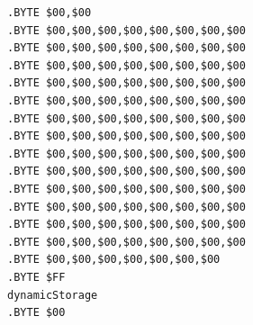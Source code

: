 \begin{minipage}[b]{1\linewidth}
\begin{minipage}[b]{0.33\linewidth}
\begin{lrbox}{\mybox}
\begin{lstlisting}[basicstyle=\ttfamily\tiny]
.BYTE $00,$00
.BYTE $00,$00,$00,$00,$00,$00,$00,$00
.BYTE $00,$00,$00,$00,$00,$00,$00,$00
.BYTE $00,$00,$00,$00,$00,$00,$00,$00
.BYTE $00,$00,$00,$00,$00,$00,$00,$00
.BYTE $00,$00,$00,$00,$00,$00,$00,$00
.BYTE $00,$00,$00,$00,$00,$00,$00,$00
.BYTE $00,$00,$00,$00,$00,$00,$00,$00
.BYTE $00,$00,$00,$00,$00,$00,$00,$00
.BYTE $00,$00,$00,$00,$00,$00,$00,$00
.BYTE $00,$00,$00,$00,$00,$00,$00,$00
.BYTE $00,$00,$00,$00,$00,$00,$00,$00
.BYTE $00,$00,$00,$00,$00,$00,$00,$00
.BYTE $00,$00,$00,$00,$00,$00,$00,$00
.BYTE $00,$00,$00,$00,$00,$00,$00
.BYTE $FF
dynamicStorage
.BYTE $00
\end{lstlisting}
\end{lrbox}%
\scalebox{0.8}{\usebox{\mybox}}
\end{minipage}
\end{minipage}
